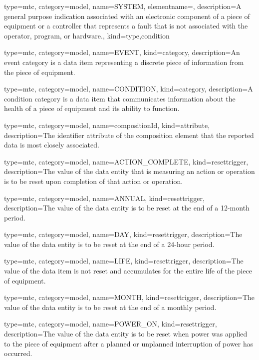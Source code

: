 {
  type=mtc,
  category=model,
  name={SYSTEM},
  elementname=,
  description={A general purpose indication associated with an electronic component of a piece of equipment or a controller that represents a fault that is not associated with the operator, program, or hardware.},
  kind={type,condition}
}


{
  type=mtc,
  category=model,
  name={EVENT},
  kind={category},
  description={An \gls{event category} is a data item representing a discrete piece of information from the piece of equipment. }
}


{
  type=mtc,
  category=model,
  name={CONDITION},
  kind={category},
  description={A \gls{condition category} is a data item that communicates information about the health of a piece of equipment and its ability to function. }
}


{
  type=mtc,
  category=model,
  name={compositionId},
  kind={attribute},
  description={The identifier attribute of the \gls{composition} element that the reported data is most closely associated. }
}


{
  type=mtc,
  category=model,
  name={ACTION\_COMPLETE},
  kind={resettrigger},
  description={The value of the \gls{data entity} that is measuring an action or operation is to be reset upon completion of that action or operation.}
}


{
  type=mtc,
  category=model,
  name={ANNUAL},
  kind={resettrigger},
  description={The value of the \gls{data entity} is to be reset at the end of a 12-month period.}
}


{
  type=mtc,
  category=model,
  name={DAY},
  kind={resettrigger},
  description={The value of the \gls{data entity} is to be reset at the end of a 24-hour period.}
}


{
  type=mtc,
  category=model,
  name={LIFE},
  kind={resettrigger},
  description={The value of the data item is not reset and accumulates for the entire life of the piece of equipment.}
}


{
  type=mtc,
  category=model,
  name={MONTH},
  kind={resettrigger},
  description={The value of the \gls{data entity} is to be reset at the end of a monthly period.}
}


{
  type=mtc,
  category=model,
  name={POWER\_ON},
  kind={resettrigger},
  description={The value of the \gls{data entity} is to be reset when power was applied to the piece of equipment after a planned or unplanned interruption of power has occurred.}
}



